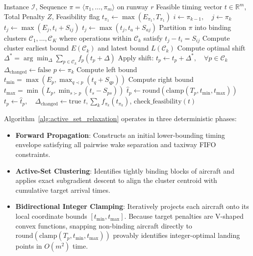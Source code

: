 \documentclass[10pt,journal,compsoc]{IEEEtran}
\begin{document}
\begin{algorithm}[t]
\caption{DAG-Aware Active-Set Coordinate Relaxation}
\label{alg:active_set_relaxation}
\begin{algorithmic}[1]
\REQUIRE Instance $\mathcal{I}$, Sequence $\pi = \langle \pi_1, \dots, \pi_m \rangle$ on runway $r$
\ENSURE Feasible timing vector $t \in \mathbb{R}^m$, Total Penalty $Z$, Feasibility flag
\STATE {}
\STATE $t_{\pi_1} \leftarrow \max(E_{\pi_1}, T_{\pi_1})$
    \STATE $i \leftarrow \pi_{k-1}, \quad j \leftarrow \pi_k$
    \STATE $t_j \leftarrow \max(E_j, t_i + S_{ij})$
        \STATE $t_j \leftarrow \max(t_j, t_a + S_{aj})$
    \ENDIF
\ENDFOR
\STATE {}
\STATE Partition $\pi$ into binding clusters $\mathcal{C}_1, \dots, \mathcal{C}_K$ where operations within $\mathcal{C}_k$ satisfy $t_j - t_i = S_{ij}$
    \STATE Compute cluster earliest bound $E(\mathcal{C}_k)$ and latest bound $L(\mathcal{C}_k)$
    \STATE Compute optimal shift $\Delta^* = \arg\min_{\Delta} \sum_{p \in \mathcal{C}_k} f_p(t_p + \Delta)$
    \STATE Apply shift: $t_p \leftarrow t_p + \Delta^*, \quad \forall p \in \mathcal{C}_k$
\ENDFOR
\STATE {}
\REPEAT
    \STATE $\Delta_{\text{changed}} \leftarrow \text{false}$
        \STATE $p \leftarrow \pi_k$
        \STATE Compute left bound $t_{\min} = \max(E_p, \max_{q \prec p} (t_q + S_{qp}))$
        \STATE Compute right bound $t_{\max} = \min(L_p, \min_{s \succ p} (t_s - S_{ps}))$
        \STATE $\hat{t}_p \leftarrow \text{round}(\text{clamp}(T_p, t_{\min}, t_{\max}))$
            \STATE $t_p \leftarrow \hat{t}_p, \quad \Delta_{\text{changed}} \leftarrow \text{true}$
        \ENDIF
    \ENDFOR
{}
\RETURN $t, \sum_k f_{\pi_k}(t_{\pi_k})$, $\text{check\_feasibility}(t)$
\end{algorithmic}
\end{algorithm}

Algorithm~\ref{alg:active_set_relaxation} operates in three deterministic phases:
\begin{itemize}
    \item \textbf{Forward Propagation}: Constructs an initial lower-bounding timing envelope satisfying all pairwise wake separation and taxiway FIFO constraints.
    \item \textbf{Active-Set Clustering}: Identifies tightly binding blocks of aircraft and applies exact subgradient descent to align the cluster centroid with cumulative target arrival times.
    \item \textbf{Bidirectional Integer Clamping}: Iteratively projects each aircraft onto its local coordinate bounds $[t_{\min}, t_{\max}]$. Because target penalties are V-shaped convex functions, snapping non-binding aircraft directly to $\text{round}(\text{clamp}(T_p, t_{\min}, t_{\max}))$ provably identifies integer-optimal landing points in $O(m^2)$ time.
\end{itemize}
\end{document}

